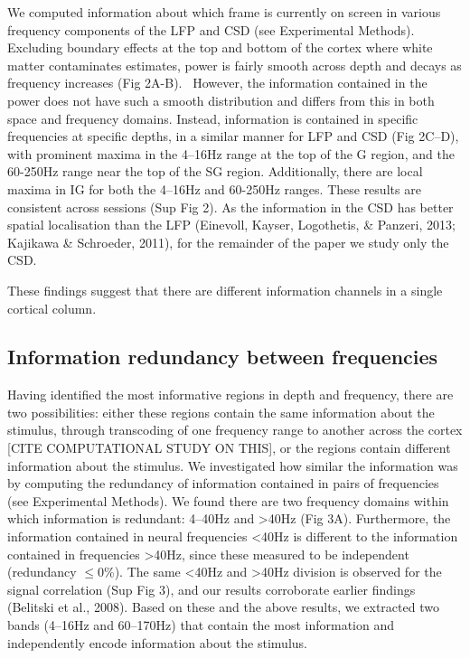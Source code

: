 \documentclass{article}
\begin{document}
We computed information about which frame is currently on screen in various frequency components of the LFP and CSD (see Experimental Methods). Excluding boundary effects at the top and bottom of the cortex where white matter contaminates estimates, power is fairly smooth across depth and decays as frequency increases (Fig 2A-B). \ However, the information contained in the power does not have such a smooth distribution and differs from this in both space and frequency domains. Instead, information is contained in specific frequencies at specific depths, in a similar manner for LFP and CSD (Fig 2C--D), with prominent maxima in the 4--16Hz range at the top of the G region, and the 60-250Hz range near the top of the SG region. Additionally, there are local maxima in IG for both the 4--16Hz and 60-250Hz ranges. These results are consistent across sessions (Sup Fig 2). As the information in the CSD has better spatial localisation than the LFP (Einevoll, Kayser, Logothetis, \& Panzeri, 2013; Kajikawa \& Schroeder, 2011), for the remainder of the paper we study only the CSD.

These findings suggest that there are different information channels in a single cortical column.

\subsection{Information redundancy between frequencies}
Having identified the most informative regions in depth and frequency, there are two possibilities: either these regions contain the same information about the stimulus, through transcoding of one frequency range to another across the cortex [CITE COMPUTATIONAL STUDY ON THIS], or the regions contain different information about the stimulus. We investigated how similar the information was by computing the redundancy of information contained in pairs of frequencies (see Experimental Methods). We found there are two frequency domains within which information is redundant: 4--40Hz and {\textgreater}40Hz (Fig 3A). Furthermore, the information contained in neural frequencies {\textless}40Hz is different to the information contained in frequencies {\textgreater}40Hz, since these measured to be independent (redundancy ${\leq}$0\%). The same {\textless}40Hz and {\textgreater}40Hz division is observed for the signal correlation (Sup Fig 3), and our results corroborate earlier findings (Belitski et al., 2008). Based on these and the above results, we extracted two bands (4--16Hz and 60--170Hz) that contain the most information and independently encode information about the stimulus.
\end{document}
